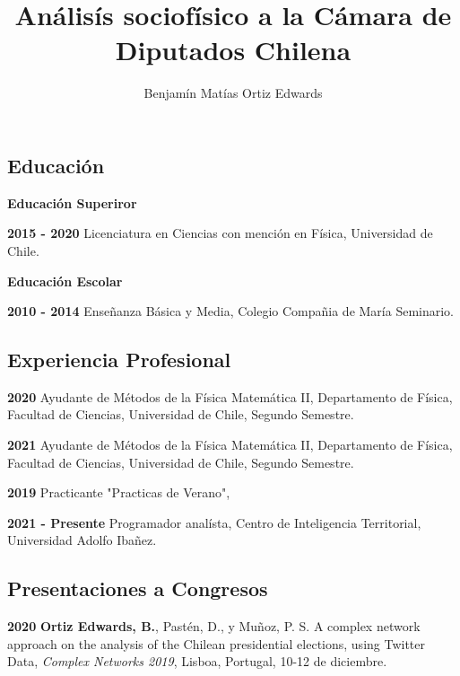 \documentclass{proyectotesis}
\title{Análisís sociofísico a la Cámara de Diputados Chilena}
\author{Benjamín Matías Ortiz Edwards}
\begin{document}
\maketitlepage

\makepersonalinfo

\subsection{Educación}
\begin{cvlist}{}
\item[\textbf{Educación Superiror}] 
\item[\textbf{2015 - 2020}] Licenciatura en Ciencias con mención en Física, Universidad de Chile.
\item[\bf Educación Escolar]
\item[\textbf{2010 - 2014}]  Enseñanza Básica y Media, Colegio Compañia de María Seminario.
\end{cvlist}

\subsection{Experiencia Profesional}
\begin{cvlist}{}
\item[\textbf{2020}]   Ayudante de Métodos de la Física Matemática II, Departamento de Física, Facultad de Ciencias, Universidad de Chile, Segundo Semestre.
\item[\textbf{2021}]   Ayudante de Métodos de la Física Matemática II, Departamento de Física, Facultad de Ciencias, Universidad de Chile, Segundo Semestre.
\item[\textbf{2019}]  Practicante "Practicas de Verano",  
\item[\textbf{2021 - Presente}] Programador analísta, Centro de Inteligencia Territorial, Universidad Adolfo Ibañez. 

\end{cvlist}

\subsection{Presentaciones a Congresos}

\begin{cvlist}{}
\item[\textbf{2020}] \textbf{Ortiz Edwards, B.}, Pastén, D., y Muñoz, P. S. A complex network approach on the analysis of the Chilean presidential elections, using Twitter Data, {\it Complex Networks 2019}, Lisboa, Portugal, 10-12 de diciembre.

\end{cvlist}
\end{document}

